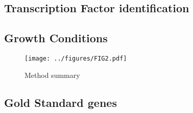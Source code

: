 


\subsection{Transcription Factor identification}
\subsection{Growth Conditions}
\begin{figure}
    \centering
    \texttt{[image: ../figures/FIG2.pdf]}
    \caption{Method summary}
    \label{fig:method_sum}
\end{figure}
\subsection{Gold Standard genes}
